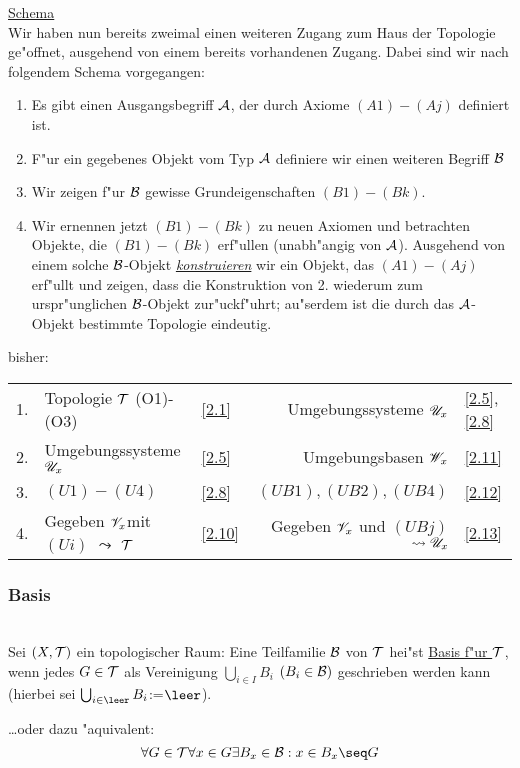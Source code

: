 \begin{beispiel}
\begin{enumerate}
\end{enumerate}
\end{beispiel}
\begin{bem}\label{2.15}\ul{Schema}\\
Wir haben nun bereits zweimal einen weiteren Zugang zum Haus der Topologie ge"offnet, ausgehend von einem bereits vorhandenen Zugang. Dabei sind wir nach folgendem Schema vorgegangen:
\begin{enumerate}
\item Es gibt einen Ausgangsbegriff $\cal A$, der durch Axiome $(A1)-(Aj)$ definiert ist.
\item F"ur ein gegebenes Objekt vom Typ $\cal A$ definiere wir einen weiteren Begriff $\cal B$
\item Wir zeigen f"ur $\cal B$ gewisse Grundeigenschaften $(B1)-(Bk)$.
\item Wir ernennen jetzt $(B1)-(Bk)$ zu neuen Axiomen und betrachten Objekte, die $(B1)-(Bk)$ erf"ullen (unabh"angig von $\cal A$). Ausgehend von einem solche $\cal B$-Objekt \ul{\it konstruieren} wir ein Objekt, das $(A1)-(Aj)$ erf"ullt und zeigen, dass die Konstruktion von 2. wiederum zum urspr"unglichen $\cal B$-Objekt zur"uckf"uhrt; au"serdem ist die durch das $\cal A$-Objekt bestimmte Topologie eindeutig.
\end{enumerate}
bisher:\\
\begin{tabular}{cll|rl}
1.&Topologie $\mathcal T$ (O1)-(O3)&\ref{2.1}&Umgebungssysteme ${\mathscr U}_{x}$&\ref{2.5},\ref{2.8}\\
2.&Umgebungssysteme ${\mathscr U}_{x}$&\ref{2.5}&Umgebungsbasen ${\mathscr W}_{x}$&\ref{2.11}\\
3.&$(U1)-(U4)$&\ref{2.8}&$(UB1),(UB2),(UB4)$&\ref{2.12}\\
4.& Gegeben ${\mathscr V}_{x}$mit $(Ui)$ $\leadsto$ $\mathcal T$&\ref{2.10}& Gegeben ${\mathscr V}_{x}$ und $(UBj)$ $\leadsto {\mathscr U}_{x}$&\ref{2.13}
\end{tabular}
\end{bem}

\subsubsection{Basis}
\begin{definition}\label{2.16}\\
Sei $(X, \mathcal T )$ ein topologischer Raum: Eine Teilfamilie $\mathcal B$ von $\mathcal T$ hei"st \ul{Basis f"ur $\mathcal T$}, wenn jedes $G\in \mathcal T$ als Vereinigung $\bigcup_{i\in I}B_i$ $(B_i\in\mathcal B)$ geschrieben werden kann (hierbei sei $\bigcup_{i\in\leer}B_i$:=$\leer$).
\end{definition}
\begin{bem}\label{2.17}{\dots oder dazu "aquivalent:}\\
$$\forall G\in\T\forall x\in G\exists B_x\in\B: x\in B_x\seq G$$
\end{bem}

